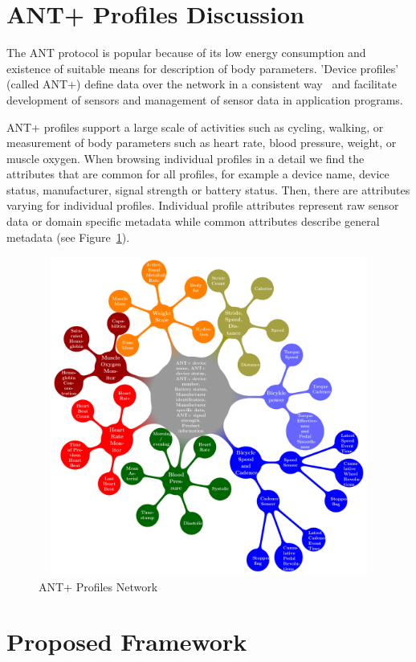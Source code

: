 \documentclass[a4paper,twoside]{article}
\begin{document}
\section{ANT+ Profiles Discussion}\label{sec:ant-plus-profiles}
The ANT protocol is popular because of its low energy consumption and existence of suitable means for description of body parameters. 'Device profiles' (called ANT+) define data over the network in a consistent way~\cite{innovations2013ant} and facilitate development of sensors and management of sensor data in application programs.

ANT+ profiles support a large scale of activities such as cycling, walking, or measurement of body parameters such as heart rate, blood pressure, weight, or muscle oxygen. When browsing individual profiles in a detail we find the attributes that are common for all profiles, for example a device name, device status, manufacturer, signal strength or battery status. Then, there are attributes varying for individual profiles. Individual profile attributes represent raw sensor data or domain specific metadata while common attributes describe general metadata (see Figure~\ref{AntPlus}).


\begin{figure}
\centering\includegraphics[width=14cm, height=10.5cm]{AntPlusProfiles}
\caption{\label{AntPlus}ANT+ Profiles Network}
\end{figure}


\section{Proposed Framework}\label{sec:framework}
\end{document}
